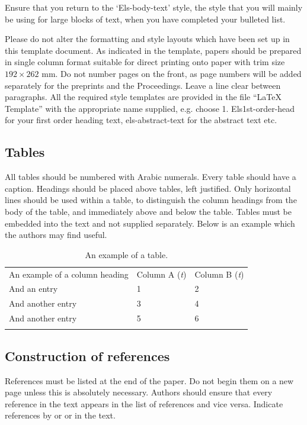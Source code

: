 \documentclass[5p,times,procedia]{Definitions/elsarticle}
\begin{document}
Ensure that you return to the `Els-body-text' style, the style that you will mainly be using for large blocks of text, when you have completed your bulleted list. 

Please do not alter the formatting and style layouts which have been set up in this template document. As indicated in the template, papers should be prepared in single column format suitable for direct printing onto paper with trim size $192 \times 262$ mm. Do not number pages on the front, as page numbers will be added separately for the preprints and the Proceedings. Leave a line clear between paragraphs. All the required style templates are provided in the file ``LaTeX Template'' with the appropriate name supplied, e.g. choose 1. Els1st-order-head for your first order heading text, els-abstract-text for the abstract text etc.

\subsection{ Tables}

All tables should be numbered with Arabic numerals. Every table should have a caption. Headings should be placed above tables, left justified. Only horizontal lines should be used within a table, to distinguish the column headings from the body of the table, and immediately above and below the table. Tables must be embedded into the text and not supplied separately. Below is an example which the authors may find useful.

\begin{table}[h]
\caption{An example of a table.}
\begin{tabular*}{\hsize}{@{\extracolsep{\fill}}lll@{}}
\toprule
An example of a column heading & Column A ({\it{t}}) & Column B ({\it{t}})\\
\colrule
And an entry &   1 &  2\\
And another entry  & 3 &  4\\
And another entry &  5 &  6\\
\botrule
\end{tabular*}
\end{table}


\subsection{ Construction of references}

References must be listed at the end of the paper. Do not begin them on a new page unless this is absolutely necessary. Authors should ensure that every reference in the text appears in the list of references and vice versa. Indicate references by \cite{clark} or \cite{Deal} or \cite{Fachinger2006} in the text. 
\end{document}
